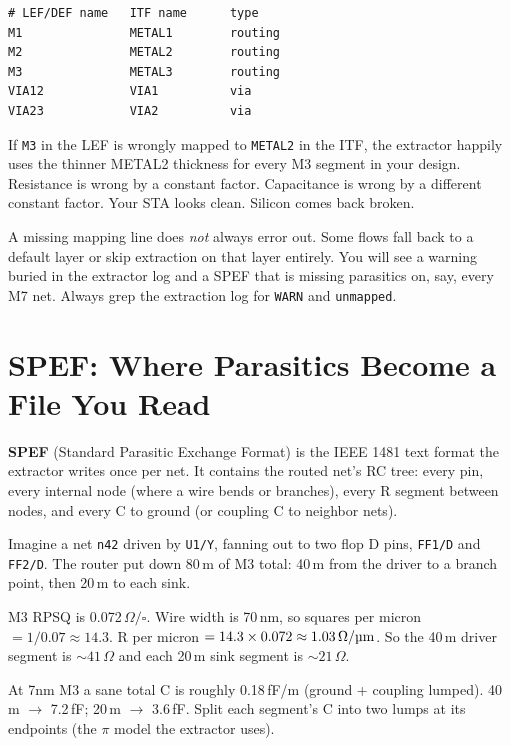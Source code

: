 \begin{lstlisting}[style=eda,caption={A tiny but mission critical mapping file.}]
# LEF/DEF name   ITF name      type
M1               METAL1        routing
M2               METAL2        routing
M3               METAL3        routing
VIA12            VIA1          via
VIA23            VIA2          via
\end{lstlisting}

If \texttt{M3} in the LEF is wrongly mapped to \texttt{METAL2} in the ITF, the extractor happily uses the thinner METAL2 thickness for every M3 segment in your design. Resistance is wrong by a constant factor. Capacitance is wrong by a different constant factor. Your STA looks clean. Silicon comes back broken.

\begin{pitfall}
A missing mapping line does \emph{not} always error out. Some flows fall back to a default layer or skip extraction on that layer entirely. You will see a warning buried in the extractor log and a SPEF that is missing parasitics on, say, every M7 net. Always grep the extraction log for \texttt{WARN} and \texttt{unmapped}.
\end{pitfall}

\section{SPEF: Where Parasitics Become a File You Read}

\textbf{SPEF} (Standard Parasitic Exchange Format) is the IEEE 1481 text format the extractor writes once per net. It contains the routed net's RC tree: every pin, every internal node (where a wire bends or branches), every R segment between nodes, and every C to ground (or coupling C to neighbor nets).

 Imagine a net \texttt{n42} driven by \texttt{U1/Y}, fanning out to two flop D pins, \texttt{FF1/D} and \texttt{FF2/D}. The router put down 80\,\textmu m of M3 total: 40\,\textmu m from the driver to a branch point, then 20\,\textmu m to each sink.

 M3 RPSQ is 0.072\,$\Omega/\square$. Wire width is 70\,nm, so squares per micron $= 1/0.07 \approx 14.3$. R per micron $= 14.3 \times 0.072 \approx 1.03\,\Omega/\text{\textmu m}$. So the 40\,\textmu m driver segment is $\sim 41\,\Omega$ and each 20\,\textmu m sink segment is $\sim 21\,\Omega$.

 At 7nm M3 a sane total C is roughly 0.18\,fF/\textmu m (ground + coupling lumped). 40\,\textmu m $\to$ 7.2\,fF; 20\,\textmu m $\to$ 3.6\,fF. Split each segment's C into two lumps at its endpoints (the $\pi$ model the extractor uses).

